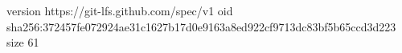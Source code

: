 version https://git-lfs.github.com/spec/v1
oid sha256:372457fe072924ae31c1627b17d0e9163a8ed922cf9713dc83bf5b65ccd3d223
size 61
